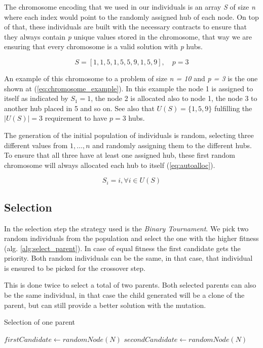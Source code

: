\documentclass[onecolumn]{IEEEtran}
\begin{document}
The chromosome encoding that we used in our individuals is an array \emph{S} of size \emph{n} where each
index would point to the randomly assigned hub of each node. On top of that, these individuals are built
with the necessary contracts to ensure that they always contain \emph{p} unique values stored in the chromosome,
that way we are ensuring that every chromosome is a valid solution with \emph{p} hubs.

\begin{equation}
  S = [1, 1, 5, 1, 5, 5, 9, 1, 5, 9 ],\quad p = 3 \label{eq:chromosome_example}
\end{equation}

An example of this chromosome to a problem of size \emph{n = 10} and \emph{p = 3} is the one shown
at (\ref{eq:chromosome_example}). In this example the node 1 is assigned to itself as indicated
by $S_{1}=1$, the node 2 is allocated also to node 1, the node 3 to another hub placed in 5 and so on.
See also that $U(S)=\{1,5,9\}$ fulfilling the $|U(S)|=3$ requirement to have $p=3$ hubs.

The generation of the initial population of individuals is random, selecting three different values from
${1,\dots,n}$ and randomly assigning them to the different hubs. To ensure that all three have at least
one assigned hub, these first random chromosome will always allocated each hub to itself (\ref{eq:autoalloc}).

\begin{equation}
  S_{i}=i, \forall i \in U(S) \label{eq:autoalloc}
\end{equation}

\subsection{Selection}

In the selection step the strategy used is the \emph{Binary Tournament}. We pick two random individuals from
the population and select the one with the higher fitness (alg. \ref{alg:select_parent}).
In case of equal fitness the first candidate gets the priority. Both random individuals can be the same,
in that case, that individual is ensured to be picked for the crossover step.

This is done twice to select a total of two parents.  Both selected parents can also be the same individual,
in that case the child generated will be a clone of the parent, but can still provide a better solution with
the mutation.

\begin{algorithm}[H]
\caption{Selection of one parent}
\label{alg:select_parent}
\begin{algorithmic}[1]
    \State $firstCandidate \gets randomNode(N)$
    \State $secondCandidate \gets randomNode(N)$
      \State {}
    \Else
      \State {}
    \EndIf
  \EndFunction
\end{algorithmic}
\end{algorithm}
\end{document}
